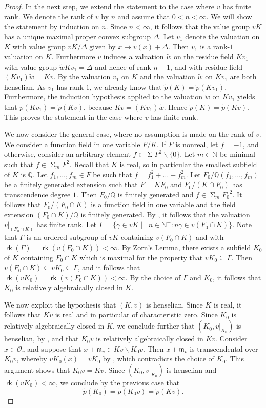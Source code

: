 \documentclass[12pt,leqno]{amsart}
\newcommand{\qq}{\mathbb Q}
\newcommand{\nat}{\mathbb{N}}
\newcommand{\mc}[1]{\mathcal{#1}}
\renewcommand{\setminus}{\smallsetminus}
\DeclareMathOperator{\newsum}{\mathsf{\Sigma}}
\renewcommand{\sum}{\newsum}
\newcommand{\sums}[1]{\sum\!{#1}^2}
\newcommand{\sos}[2]{\sum_{#1}\!{#2}^2}
\DeclareMathOperator{\rk}{\mathsf{rk}}
\newcommand{\wt}[1]{\widetilde{{#1}}}
\newcommand{\mfm}{\mathfrak{m}}
\numberwithin{equation}{section}
\theoremstyle{definition}
\theoremstyle{plain}
\begin{document}
\begin{proof}
In the next step, we extend the statement to the case where $v$ has finite rank.
We denote the rank of $v$ by $n$ and assume that $0<n<\infty$.
We will show the statement by induction on $n$.
Since $n<\infty$, it follows that the value group $vK$ has a unique maximal proper convex subgroup $\Delta$.
Let $v_1$ denote the valuation on $K$ with value group $vK/\Delta$ given by $x\mapsto v(x)+\Delta$.
Then $v_1$ is a rank-$1$ valuation on $K$.
Furthermore $v$ induces a valuation $\wt{w}$ on the residue field $Kv_1$ with value group $\wt{w}Kv_1=\Delta$ and hence of rank $n-1$, and with residue field $(Kv_1)\wt{w}=Kv$.
By \cite[Cor.~4.1.4]{EP05} the valuation $v_1$ on $K$ and the valuation $\wt{w}$ on $Kv_1$ are both henselian.
As $v_1$ has rank $1$, we already know that $\wt{p}(K)=\wt{p}(Kv_1)$.
Furthermore, the induction hypothesis applied to the valuation $\wt{w}$ on $Kv_1$ yields that  $\wt{p}(Kv_1)=\wt{p}(Kv)$, because $Kv=(Kv_1)\wt{w}$. Hence $\wt{p}(K)=\wt{p}(Kv)$.
This proves the statement in the case where $v$ has finite rank.

We now consider the general case, where no assumption is made on the rank of $v$.
We consider a function field in one variable $F/K$. 
If $F$ is nonreal, let $f=-1$, and otherwise, consider an arbitrary element $f\in\sums{F}\setminus\{0\}$.
Let $m\in\nat$ be minimal such that $f \in \sos{m}{F}$.
Recall that $K$ is real, so in particular the smallest subfield of $K$ is $\qq$.
Let $f_1,\dots,f_m\in F$ be such that $f=f_1^2+\dots+f_m^2$.
Let $F_0/\qq(f_1,\dots,f_m)$ be a finitely generated extension such that $F=KF_0$ and $F_0/(K\cap F_0)$ has transcendence degree $1$.
Then $F_0/\qq$ is finitely generated and $f\in\sos{m}{F_0}$.
It follows that $F_0/(F_0\cap K)$ is a function field in one variable and the field extension $(F_0\cap K)/\qq$ is finitely generated.
By \cite[Prop.~3.4.1 and Theorem~3.4.3]{EP05}, it follows that the valuation $v|_{(F_0\cap K)}$ has finite rank.
Let $\Gamma=\{\gamma\in vK\mid \exists n\in\nat^+:n\gamma\in v(F_0\cap K)\}$.
Note that $\Gamma$ is an ordered subgroup of $vK$ containing $v(F_0\cap K)$ and with $\rk(\Gamma)=\rk(v(F_0\cap K))<\infty$.
By Zorn's Lemma, there exists a subfield $K_0$ of $K$ containing $F_0\cap K$ which is maximal for the property that $vK_0\subseteq \Gamma$. 
Then $v(F_0\cap K)\subseteq vK_0\subseteq\Gamma$, and it follows that $\rk(vK_0)=\rk(v(F_0\cap K))<\infty$.
By the choice of $\Gamma$ and $K_0$, it follows that $K_0$ is relatively algebraically closed in $K$.

We now exploit the hypothesis that $(K,v)$ is henselian.
Since $K$ is real, it follows that $Kv$ is real and in particular of characteristic zero.
Since $K_0$ is relatively algebraically closed in $K$, we conclude further that $(K_0,v|_{K_0})$ is henselian, 
by \cite[Cor.~4.1.5]{EP05},
and that $K_0v$ is relatively algebraically closed in $Kv$.
Consider $x\in\mc{O}_v$ and suppose that $x+\mfm_v\in Kv\setminus K_0v$.
Then $x+\mfm_v$ is transcendental over $K_0v$, whereby $vK_0(x)=vK_0$ by \cite[Cor.~2.2.2]{EP05}, which contradicts the choice of $K_0$.
This argument shows that $K_0v=Kv$.
Since $(K_0,v|_{K_0})$ is henselian and $\rk(vK_0)<\infty$, we conclude by the previous case that 
\[\wt{p}(K_0)= \wt{p}(K_0v)= \wt{p}(Kv).\]


\end{proof}
\end{document}
